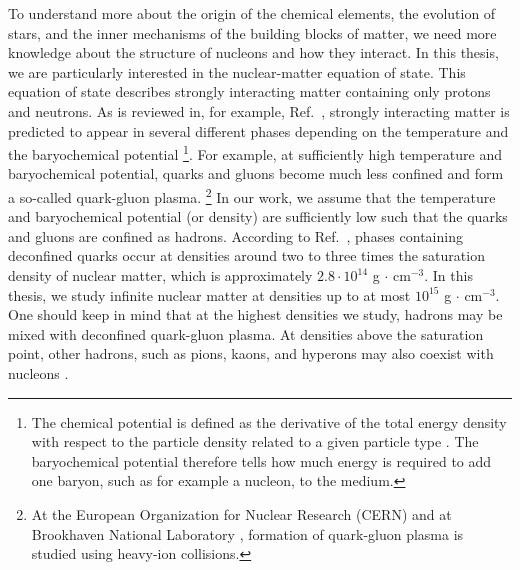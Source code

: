 \documentclass[a4paper,12pt]{report}
\begin{document}
To understand more about the origin of the 
chemical elements, the evolution of stars, and the inner 
mechanisms of the building blocks of matter, we need more
knowledge about the structure of nucleons and how they 
interact. In this thesis, we are particularly interested 
in the nuclear-matter equation of state. This equation of 
state describes strongly interacting matter containing
only protons and neutrons. As is reviewed in, for example, 
Ref.~\cite{braun_2009}, strongly interacting matter is 
predicted to appear in several different phases depending 
on the temperature and the baryochemical potential 
\footnote{The chemical potential is defined as the 
derivative of the total energy density with respect to the
particle density related to a given particle type 
\cite{heiselberg}. The baryochemical potential therefore 
tells how much energy is required to add one baryon,
such as for example a nucleon, to the medium.}.      
For example, at sufficiently high temperature and 
baryochemical potential, quarks and gluons become much 
less confined and form a so-called quark-gluon plasma. 
\footnote{At the European Organization for Nuclear Research (CERN) 
\cite{cern_qgp} and at Brookhaven National Laboratory 
\cite{rhic_qgp}, formation of quark-gluon plasma 
is studied using heavy-ion collisions.} In our work,
we assume that the temperature and baryochemical
potential (or density) are sufficiently low such that 
the quarks and gluons are confined as hadrons. 
According to Ref.~\cite{heiselberg}, phases containing 
deconfined quarks occur at densities around two to 
three times the saturation density of nuclear matter,
which is approximately $2.8 \cdot 10^{14}$ g $\cdot $ 
cm$^{-3}$. In this thesis, we study infinite nuclear 
matter at densities up to at most 
$10^{15}$ g $\cdot $ cm$^{-3}$. One should keep
in mind that at the highest densities we study, hadrons
may be mixed with deconfined quark-gluon plasma. 
At densities above the saturation point, other hadrons, 
such as pions, kaons, and hyperons may also coexist 
with nucleons \cite{heiselberg,lattimer2004}. 
\end{document}
